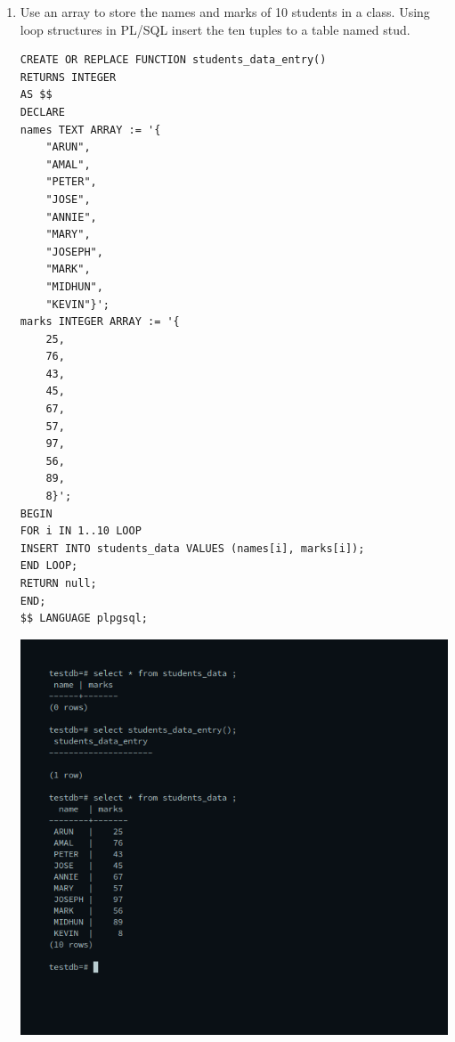 \begin{enumerate}
\item Use an array to store the names and marks of 10 students in a class. Using loop structures in PL/SQL insert the ten tuples to a table named stud. \newline
\begin{verbatim}
CREATE OR REPLACE FUNCTION students_data_entry()
RETURNS INTEGER
AS $$
DECLARE
names TEXT ARRAY := '{
	"ARUN",
	"AMAL",
	"PETER",
	"JOSE",
	"ANNIE",
	"MARY",
	"JOSEPH",
	"MARK",
	"MIDHUN",
	"KEVIN"}';
marks INTEGER ARRAY := '{
	25,
	76,
	43,
	45,
	67,
	57,
	97,
	56,
	89,
	8}';
BEGIN
FOR i IN 1..10 LOOP
INSERT INTO students_data VALUES (names[i], marks[i]);
END LOOP;
RETURN null;
END;
$$ LANGUAGE plpgsql;
\end{verbatim}
\newline
\includegraphics[width=\linewidth]{../Images/Plsql/5.png}


\end{enumerate}
